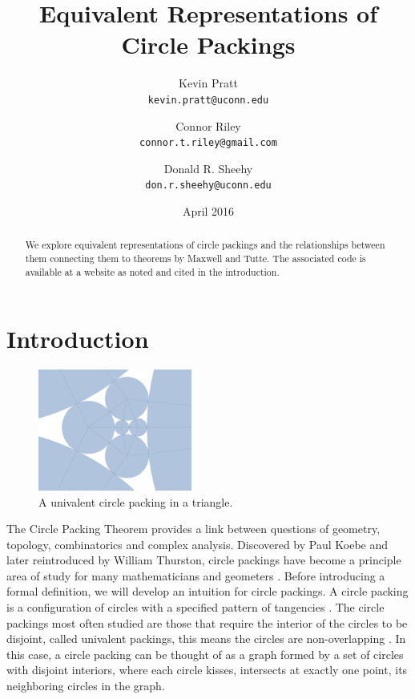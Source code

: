 \documentclass[11pt]{article}
\title{Equivalent Representations of Circle Packings}
\author{
  Kevin Pratt\\
  \texttt{kevin.pratt@uconn.edu}
  \and
  Connor Riley\\
  \texttt{connor.t.riley@gmail.com}
    \and
  Donald R. Sheehy\\
  \texttt{don.r.sheehy@uconn.edu}
}\date{April 2016}
\theoremstyle{definition}
\begin{document}
\maketitle

\begin{abstract}
  We explore equivalent representations of circle packings and the relationships between them connecting them to theorems by Maxwell and Tutte.  
  The associated code is available at a website as noted and cited in the introduction.
\end{abstract}

\section{Introduction}

\begin{figure}
  \begin{center}
    \includegraphics[scale=.18,width=0.45\textwidth]{circlepacking_1}
  \end{center}
  \caption{A univalent circle packing in a triangle.}
\end{figure}

	The Circle Packing Theorem provides a link between questions of geometry, topology, combinatorics and complex analysis. 
	Discovered by Paul Koebe and later reintroduced by William Thurston, circle packings have become a principle area of study for many mathematicians and geometers \cite{wilkerson}. 
	Before introducing a formal definition, we will develop an intuition for circle packings. 
	A circle packing is a configuration of circles with a specified pattern of tangencies \cite{stephenson05introduction}. 
	The circle packings most often studied are those that require the interior of the circles to be disjoint, called univalent packings, this means the circles are non-overlapping \cite{stephenson05introduction}. 
	In this case, a circle packing can be thought of as a graph formed by a set of circles with disjoint interiors, where each circle kisses, intersects at exactly one point, its neighboring circles in the graph.
\end{document}
